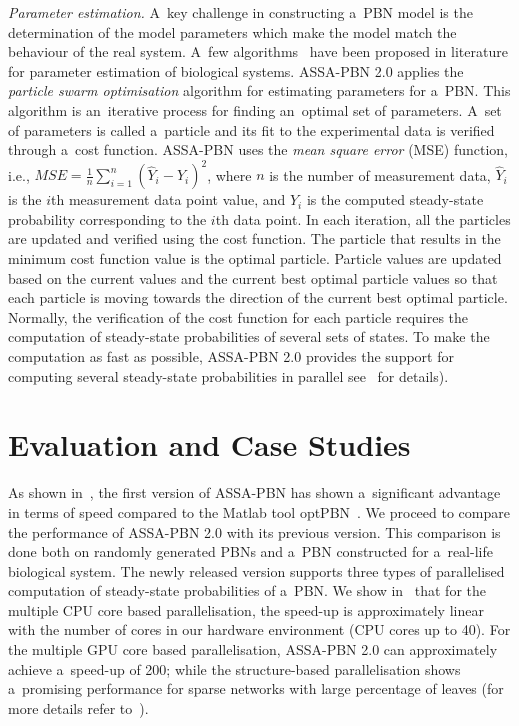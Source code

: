 \documentclass[runningheads,a4paper]{llncs}
\begin{document}
\smallskip\noindent
\emph{Parameter estimation.}
A~key challenge in constructing a~PBN model is the determination of the model parameters which
make the model match the behaviour of the real system. A~few algorithms~\cite{JR95,GB03} have been
proposed in literature for parameter estimation of biological systems. {\sf ASSA-PBN} 2.0 applies
the \textit{particle swarm optimisation} algorithm for estimating parameters for a~PBN.
This algorithm is an~iterative process for finding an~optimal set of parameters. A~set of
parameters is called a~particle and its fit to the experimental data is verified through a~cost
function. {\sf ASSA-PBN} uses the \textit{mean square error} (MSE) function, i.e.,
$MSE=\frac{1}{n}\sum_{i=1}^{n}(\hat{Y}_i-Y_i)^2$,
where $n$ is the number of measurement data,
$\hat{Y}_i$ is the $i$th measurement data point value,
and $Y_i$ is the computed steady-state probability corresponding to the $i$th data point.
In each iteration, all the particles are updated and verified using the cost function.
The particle that results in the minimum cost function value is the optimal particle.
Particle values are updated based on the current values and the current best optimal particle values
so that each particle is moving towards the direction of the current best optimal particle.
Normally, the verification of the cost function for each particle requires the computation of steady-state probabilities of several sets of states.
To make the computation as fast as possible,
{\sf ASSA-PBN} 2.0 provides the support for computing several steady-state probabilities in parallel
see~\cite{MPY15b} for details).

\section{Evaluation and Case Studies}
\label{sec:evaluation}
As shown in~\cite{assa},
the first version of {\sf ASSA-PBN} has shown a~significant advantage in terms of speed compared
to the Matlab tool optPBN~\cite{TMPTSS13}.
We proceed to compare the performance of {\sf ASSA-PBN} 2.0 with its previous version.
This comparison is done both on randomly generated PBNs and a~PBN constructed for a~real-life
biological system.
The newly released version supports
three types of parallelised computation of steady-state probabilities of a~PBN.
We show in~\cite{MPY15b} that for the multiple CPU core based parallelisation,
the speed-up is approximately linear with the number of cores in our hardware environment (CPU cores up to 40).
For the multiple GPU core based parallelisation,
{\sf ASSA-PBN} 2.0 can approximately achieve a~speed-up of  200;
while the structure-based parallelisation
shows a~promising performance for sparse networks with large percentage of leaves (for more
details refer to~\cite{MPY16a}).
\end{document}

